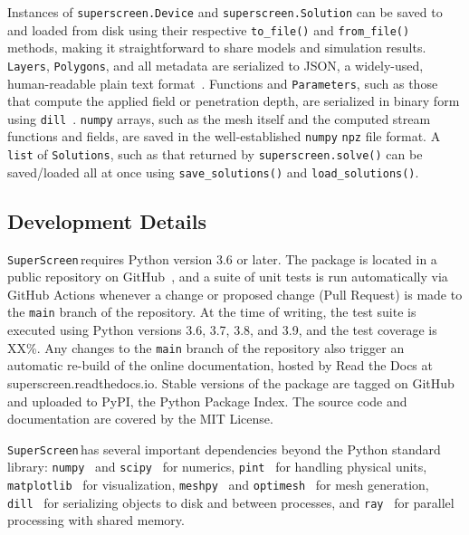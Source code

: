 \documentclass[preprint,12pt]{elsarticle}
\newcommand{\SuperScreen}{\texttt{SuperScreen}\,}
\begin{document}
Instances of \texttt{superscreen.Device} and \texttt{superscreen.Solution} can be saved to and loaded from disk using their respective \texttt{to_file()} and \texttt{from_file()} methods, making it straightforward to share models and simulation results. \texttt{Layers}, \texttt{Polygons}, and all metadata are serialized to JSON, a widely-used, human-readable plain text format~\cite{JSON}. Functions and \texttt{Parameters}, such as those that compute the applied field or penetration depth, are serialized in binary form using \texttt{dill}~\cite{McKerns}. \texttt{numpy} arrays, such as the mesh itself and the computed stream functions and fields, are saved in the well-established \texttt{numpy} \texttt{npz} file format. A \texttt{list} of \texttt{Solutions}, such as that returned by \texttt{superscreen.solve()} can be saved/loaded all at once using \texttt{save_solutions()} and \texttt{load_solutions()}.

\subsection{Development Details}
\label{section:overview:development}

\SuperScreen requires Python version 3.6 or later. The package is located in a public repository on GitHub~\cite{superscreen}, and a suite of unit tests is run automatically via GitHub Actions whenever a change or proposed change (Pull Request) is made to the \texttt{main} branch of the repository. At the time of writing, the test suite is executed using Python versions 3.6, 3.7, 3.8, and 3.9, and the test coverage is XX\%. Any changes to the \texttt{main} branch of the repository also trigger an automatic re-build of the online documentation, hosted by Read the Docs at superscreen.readthedocs.io. Stable versions of the package are tagged on GitHub and uploaded to PyPI, the Python Package Index. The source code and documentation are covered by the MIT License.

\SuperScreen has several important dependencies beyond the Python standard library: \texttt{numpy}~\cite{2020NumPy-Array} and \texttt{scipy}~\cite{2020SciPy-NMeth} for numerics, \texttt{pint}~\cite{Grecco} for handling physical units, \texttt{matplotlib}~\cite{Hunter_2007} for visualization, \texttt{meshpy}~\cite{Klockner,Shewchuk} and \texttt{optimesh}~\cite{nico_schlomer_adam_dobrawy_2021} for mesh generation, \texttt{dill}~\cite{McKerns} for serializing objects to disk and between processes, and \texttt{ray}~\cite{ray_2018} for parallel processing with shared memory.
\end{document}
